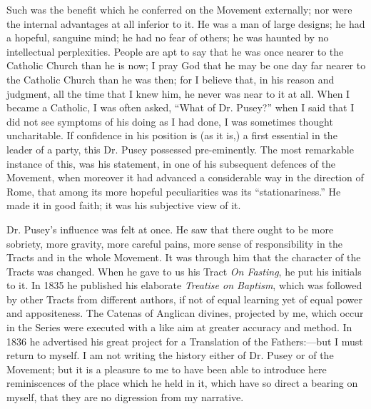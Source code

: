 Such was the benefit which he conferred on the Movement externally;
nor were the internal advantages at all inferior to it. He was a
man of large designs; he had a hopeful, sanguine mind; he had no fear of
others; he was haunted by no intellectual perplexities. People are apt
to say that he was once nearer to the Catholic Church than he is now; I
pray God that he may be one day far nearer to the Catholic Church than
he was then; for I believe that, in his reason and judgment, all the
time that I knew him, he never was near to it at all. When I became a
Catholic, I was often asked, ``What of Dr. Pusey?'' when I said
that I did not see symptoms of his doing as I had done, I was sometimes
thought uncharitable. If confidence in his position is (as it is,) a
first essential in the leader of a party, this Dr. Pusey possessed
pre-eminently.
The most remarkable instance of this, was his statement, in one of his
subsequent defences of the Movement, when moreover it had advanced
a considerable way in the direction of Rome, that among its more hopeful peculiarities was its ``stationariness.'' He made it
in good faith; it was his subjective view of it.

Dr. Pusey's influence was felt at once. He saw that there ought to be
more sobriety, more gravity, more careful pains, more sense of
responsibility in the Tracts and in the whole Movement. It was through
him that the character of the Tracts was changed. When he gave to us his
Tract \emph{On Fasting}, he put his initials to it. In 1835 he published his
elaborate \emph{Treatise on Baptism}, which was followed by other Tracts from
different authors, if not of equal learning yet of equal power and
appositeness. The Catenas of Anglican divines, projected by me,
which occur in the Series were
executed with a like aim at greater accuracy and method. In 1836 he
advertised his great project for a Translation of the Fathers:—but I
must return to myself. I am not writing the history either of Dr. Pusey
or of the Movement; but it is a pleasure to me to have been able to
introduce here reminiscences of the place which he held in it, which
have so direct a bearing on myself, that they are no digression from my
narrative.

